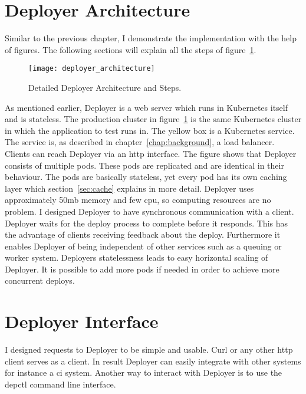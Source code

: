 \section{Deployer Architecture}

Similar to the previous chapter, I demonstrate the implementation with the help of
figures. The following sections will explain all the steps of
figure~\ref{fig:deployer_architecture}.

\begin{figure}[htbp]
  \centering
  \texttt{[image: deployer\_architecture]}
  \caption[nprtflow]{Detailed Deployer Architecture and Steps.}
  \label{fig:deployer_architecture}
\end{figure}

As mentioned earlier, Deployer is a web server which runs in Kubernetes itself and is
stateless. The production cluster in figure~\ref{fig:deployer_architecture} is the same
Kubernetes cluster in which the application to test runs in. The yellow box is a
Kubernetes service. The service is, as described in chapter~\ref{chap:background}, a
load balancer. Clients can reach Deployer via an http interface. The figure shows that
Deployer consists of multiple pods. These pods are replicated and are identical in their
behaviour. The pods are basically stateless, yet every pod has its own caching layer which
section~\ref{sec:cache} explains in more detail. Deployer uses approximately 50mb memory
and few cpu, so computing resources are no problem. I designed Deployer to have
synchronous communication with a client. Deployer waits for the deploy process to complete
before it responds. This has the advantage of clients receiving feedback about the
deploy. Furthermore it enables Deployer of being independent of other services such as a
queuing or worker system. Deployers statelessness leads to easy horizontal scaling of
Deployer. It is possible to add more pods if needed in order to achieve more concurrent
deploys.

\section{Deployer Interface}
\label{sec:interface}

I designed requests to Deployer to be simple and usable. Curl or any other http client
serves as a client. In result Deployer can easily integrate with other systems for
instance a \gls{ci} system. Another way to interact with Deployer is to use the depctl
command line interface.

